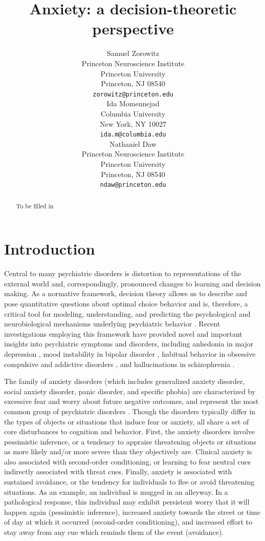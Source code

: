 \documentclass[11pt]{article} %
\title{Anxiety: a decision-theoretic perspective}
\author{
Samuel Zorowitz \\
Princeton Neuroscience Institute\\
Princeton University\\
Princeton, NJ 08540 \\
\texttt{zorowitz@princeton.edu} \\
\And
Ida Momennejad \\
Columbia University\\
New York, NY 10027 \\
\texttt{ida.m@columbia.edu} \\
\And
Nathaniel Daw \\
Princeton Neuroscience Institute\\
Princeton University\\
Princeton, NJ 08540 \\
\texttt{ndaw@princeton.edu} \\
}
\begin{document}
\maketitle

\begin{abstract}
To be filled in
\end{abstract}


\startmain

\section{Introduction}

Central to many psychiatric disorders is distortion to representations of the
external world and, correspondingly, pronounced changes to learning and decision
making. As a normative framework, decision theory allows us to describe and pose
quantita­tive questions about optimal choice behavior \citep{DayanDaw2008} and is,
therefore, a critical tool for modeling, understanding, and predicting the psychological
and neurobiological mechanisms underlying psychiatric behavior \citep{maia2011, HuysDawDayan2015}.
Recent investigations employing this framework have provided novel and important
insights into psychiatric symptoms and disorders, including anhedonia in major depression \citep{Rutledge2017},
mood instability in bipolar disorder \citep{EldarNiv2015, EldarDolanNiv2016},
habitual behavior in obsessive compulsive and addictive disorders \citep{gillan2016}, and
hallucinations in schizophrenia \citep{powers2017, corlett2018}.

The family of anxiety disorders (which includes generalized anxiety disorder, social
anxiety disorder, panic disorder, and specific phobia) are characterized by excessive
fear and worry about future negative outcomes, and represent the most common
group of psychiatric disorders \citep{kessler2009}. Though the disorders typically
differ in the types of objects or situations that induce fear or anxiety, all share
a set of core disturbances to cognition and behavior. First, the anxiety disorders
involve pessimistic inference, or a tendency to appraise threatening objects or
situations as more likely and/or more severe than they objectively are. Clinical
anxiety is also associated with second-order conditioning, or learning to fear
neutral cues indirectly associated with threat cues. Finally, anxiety is associated
with sustained avoidance, or the tendency for individuals to flee or avoid threatening
situations. As an example, an individual is mugged in an alleyway. In a pathological
response, this individual may exhibit persistent worry that it will happen again
(pessimistic inference), increased anxiety towards the street or time of day
at which it occurred (second-order conditioning), and increased effort to stay
away from any cue which reminds them of the event (avoidance).
\end{document}
